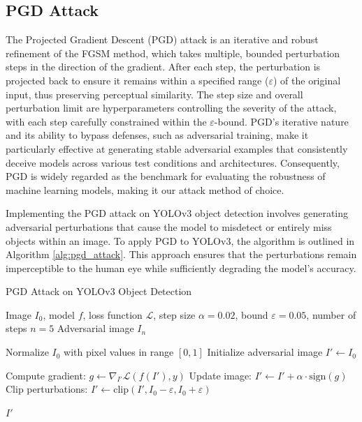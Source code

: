 \documentclass[journal,onecolumn,12pt]{IEEEtran}
\begin{document}
\subsection{PGD Attack}
The Projected Gradient Descent (PGD) attack \cite{madry2019deeplearningmodelsresistant} is an iterative and robust refinement of the FGSM method, which takes multiple, bounded perturbation steps in the direction of the gradient. After each step, the perturbation is projected back to ensure it remains within a specified range ($\varepsilon$) of the original input, thus preserving perceptual similarity. The step size and overall perturbation limit are hyperparameters controlling the severity of the attack, with each step carefully constrained within the $\varepsilon$-bound. PGD’s iterative nature and its ability to bypass defenses, such as adversarial training, make it particularly effective at generating stable adversarial examples that consistently deceive models across various test conditions and architectures. Consequently, PGD is widely regarded as the benchmark for evaluating the robustness of machine learning models, making it our attack method of choice.

Implementing the PGD attack on YOLOv3 object detection involves generating adversarial perturbations that cause the model to misdetect or entirely miss objects within an image. To apply PGD to YOLOv3, the algorithm is outlined in Algorithm \ref{alg:pgd_attack}. This approach ensures that the perturbations remain imperceptible to the human eye while sufficiently degrading the model's accuracy. 

\begin{algorithm}
    \caption{PGD Attack on YOLOv3 Object Detection}
    \label{alg:pgd_attack}
    \begin{algorithmic}[1]
    \REQUIRE Image $I_0$, model $f$, loss function $\mathcal{L}$, step size $\alpha = 0.02$, bound $\varepsilon = 0.05$, number of steps $n = 5$
    \ENSURE Adversarial image $I_n$
    
    \STATE Normalize $I_0$ with pixel values in range $[0, 1]$
    \STATE Initialize adversarial image $I' \gets I_0$
    
        \STATE Compute gradient: $g \gets \nabla_{I'} \mathcal{L}(f(I'), y)$
        \STATE Update image: $I' \gets I' + \alpha \cdot \text{sign}(g)$
        \STATE Clip perturbations: $I' \gets \text{clip}(I', I_0 - \varepsilon, I_0 + \varepsilon)$
    \ENDFOR
    
    \RETURN $I'$
    \end{algorithmic}
\end{algorithm}
\end{document}
